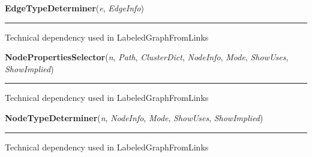     \label{System:SystemGraphOperations:EdgeTypeDeterminer}

    \vspace{0.5ex}

\hspace{.8\funcindent}\begin{boxedminipage}{\funcwidth}

    \raggedright \textbf{EdgeTypeDeterminer}(\textit{e}, \textit{EdgeInfo})

    \vspace{-1.5ex}

    \rule{\textwidth}{0.5\fboxrule}
\setlength{\parskip}{2ex}
    Technical dependency used in LabeledGraphFromLinks

\setlength{\parskip}{1ex}
    \end{boxedminipage}

    \label{System:SystemGraphOperations:NodePropertiesSelector}

    \vspace{0.5ex}

\hspace{.8\funcindent}\begin{boxedminipage}{\funcwidth}

    \raggedright \textbf{NodePropertiesSelector}(\textit{n}, \textit{Path}, \textit{ClusterDict}, \textit{NodeInfo}, \textit{Mode}, \textit{ShowUses}, \textit{ShowImplied})

    \vspace{-1.5ex}

    \rule{\textwidth}{0.5\fboxrule}
\setlength{\parskip}{2ex}
    Technical dependency used in LabeledGraphFromLinks

\setlength{\parskip}{1ex}
    \end{boxedminipage}

    \label{System:SystemGraphOperations:NodeTypeDeterminer}

    \vspace{0.5ex}

\hspace{.8\funcindent}\begin{boxedminipage}{\funcwidth}

    \raggedright \textbf{NodeTypeDeterminer}(\textit{n}, \textit{NodeInfo}, \textit{Mode}, \textit{ShowUses}, \textit{ShowImplied})

    \vspace{-1.5ex}

    \rule{\textwidth}{0.5\fboxrule}
\setlength{\parskip}{2ex}
    Technical dependency used in LabeledGraphFromLinks

\setlength{\parskip}{1ex}
    \end{boxedminipage}

